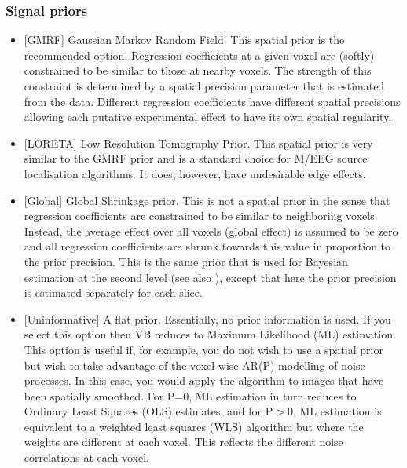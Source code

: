 \documentclass[a4paper,titlepage]{book}
\begin{document}
\subsubsection{Signal priors}
\begin{itemize}

\item{[GMRF] Gaussian Markov Random Field. This spatial prior is the recommended option. Regression coefficients at a given voxel are (softly) constrained to be similar to those at nearby voxels. The strength of this constraint is determined by a spatial precision parameter that is estimated from the data. Different regression coefficients have different spatial precisions allowing each putative experimental effect to have its own spatial regularity. }

                                                                                                            

\item{[LORETA] Low Resolution Tomography Prior. This spatial prior is very similar to the GMRF prior and is a standard choice for M/EEG source localisation algorithms. It does, however, have undesirable edge effects.}

                                                                                                            

\item{[Global] Global Shrinkage prior. This is not a spatial prior in the sense that regression coefficients are constrained to be similar to neighboring voxels. Instead, the average effect over all voxels (global effect) is assumed to be zero and all regression coefficients are shrunk towards this value in proportion to the prior precision. This is the same prior that is used for Bayesian estimation at the second level 
(see also \cite{karl_posterior}), except that here the prior precision is estimated separately for each slice. }

                                                                                                            

\item{[Uninformative] A flat prior. Essentially, no prior information is used. If you select this option then VB reduces to Maximum Likelihood (ML) estimation. This option is useful if, for example, you do not wish to use a spatial prior but wish to take advantage of the voxel-wise AR(P) modelling of noise processes. In this case, you would apply the algorithm to images that have been spatially smoothed. For P=0, ML estimation in turn reduces to Ordinary Least Squares (OLS) estimates, and for P$>$0, ML estimation is equivalent to a weighted least squares (WLS) algorithm but where the weights are different at each voxel. This reflects the different noise correlations at each voxel. }

\end{itemize}
\end{document}
